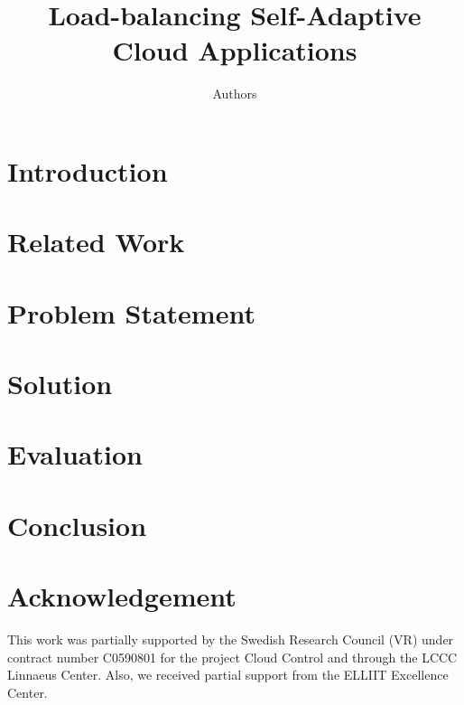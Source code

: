 \documentclass[letterpaper, 10 pt, conference]{ieeeconf}
\title{\LARGE \bf Load-balancing Self-Adaptive Cloud Applications}
\author{Authors}
\begin{document}
\maketitle
\thispagestyle{empty}
\pagestyle{empty}

\begin{abstract}

\end{abstract}

\section{Introduction}
\label{sec:introduction}


\section{Related Work}
\label{sec:related}


\section{Problem Statement}
\label{sec:problem}


\section{Solution}
\label{sec:solution}


\section{Evaluation}
\label{sec:evaluation}


\section{Conclusion}
\label{sec:conclusion}

\section*{Acknowledgement}
  This work was partially supported by the Swedish Research Council
  (VR) under contract number C0590801 for the project Cloud Control
  and through the LCCC Linnaeus Center. Also, we received partial
  support from the ELLIIT Excellence Center.

\printbibliography
\end{document}

